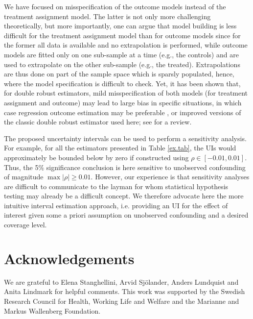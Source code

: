 \documentclass[11pt]{article}
\begin{document}
We have focused on misspecification of the outcome models instead of the treatment assignment model. The latter is not only more challenging theoretically, but more importantly, one can argue that model building is less difficult for the treatment assignment model than for outcome models since for the former all data is available and no extrapolation is performed, while outcome models are fitted only on one sub-sample at a time (e.g., the controls) and are used to extrapolate on the other sub-sample (e.g., the treated). Extrapolations are thus done on part of the sample space which is sparsly populated, hence, where the model specification is difficult to check. Yet, it has been shown that, for double robust estimators, mild misspecification of both models (for treatment assignment and outcome) may lead to large bias in specific situations, in which case regression outcome estimation may be preferable \citep{kang:07}, or improved versions of the classic double robust estimator used here; see \cite{RotnitzkyStijn:15} for a review.   
  
The proposed uncertainty intervals can be used to perform a sensitivity analysis. For example, for all the estimators presented in Table \ref{ex.tab}, the UIs would approximately be bounded below by zero if constructed using $\rho\in [-0.01,0.01]$. Thus, the 5\% significance conclusion is here sensitive to unobserved confounding of magnitude $\max|\rho|\geq 0.01$. However, our experience is that sensitivity analyses are difficult to communicate to the layman for whom statistical hypothesis testing may already be a difficult concept. 
 We therefore advocate here the more intuitive interval estimation approach, i.e. providing an UI for the effect of interest given some a priori assumption on unobserved confounding and a desired coverage level.


\section*{Acknowledgements}

We are grateful to Elena Stanghellini, Arvid Sj\"olander, Anders Lundquist and Anita Lindmark for helpful comments. This work was supported by the Swedish Research Council for Health, Working Life and Welfare and the Marianne and Markus Wallenberg Foundation.\vspace*{-8pt}
\end{document}
